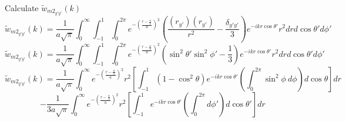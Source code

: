 \documentclass[12pt]{article}
\begin{document}
\color{black}
\[{}\]
Calculate $\widetilde{w}_{{m2}_{y'y'}}(k)$ 
\begin{equation}{\widetilde{w}_{{m2}_{y'y'}}(k)=\frac{1}{a\sqrt{\pi}}\int_{0}^{\infty}\int_{-1}^{1}\int_{0}^{2\pi}e^{-\left(\frac{r-\frac{\alpha}{2}}{a}\right)^2}\left(\frac{(r_{y'})(r_{y'})}{r^2}-\frac{\delta_{y'y'}}{3}\right)e^{-ikr\cos\theta'}r^2d{r}d{\cos\theta'}d{\phi'}}\end{equation}
\begin{equation}{\widetilde{w}_{{m2}_{y'y'}}(k)=\frac{1}{a\sqrt{\pi}}\int_{0}^{\infty}\int_{-1}^{1}\int_{0}^{2\pi}e^{-\left(\frac{r-\frac{\alpha}{2}}{a}\right)^2}\left(\sin^2\theta'\sin^2\phi'-\frac{1}{3}\right)e^{-ikr\cos\theta'}r^2d{r}d{\cos\theta'}d{\phi'}}\end{equation}
\[{}\]
\begin{displaymath}{\widetilde{w}_{{m2}_{y'y'}}(k)=\frac{1}{a\sqrt{\pi}}\int_{0}^{\infty}e^{-\left(\frac{r-\frac{\alpha}{2}}{a}\right)^2}r^2\left[\int_{-1}^{1}\left(1-\cos^2\theta\right)e^{-ikr\cos\theta'}\left(\int_{0}^{2\pi}\sin^2\phi~d{\phi}\right)d{\cos\theta}\right]d{r}}\end{displaymath} 
\begin{equation}{-\frac{1}{3a\sqrt{\pi}}\int_{0}^{\infty}e^{-\left(\frac{r-\frac{\alpha}{2}}{a}\right)^2}r^2\left[\int_{-1}^{1}e^{-ikr\cos\theta'}\left(\int_{0}^{2\pi}d{\phi'}\right)d{\cos\theta'}\right]d{r}}\end{equation}
\end{document}
